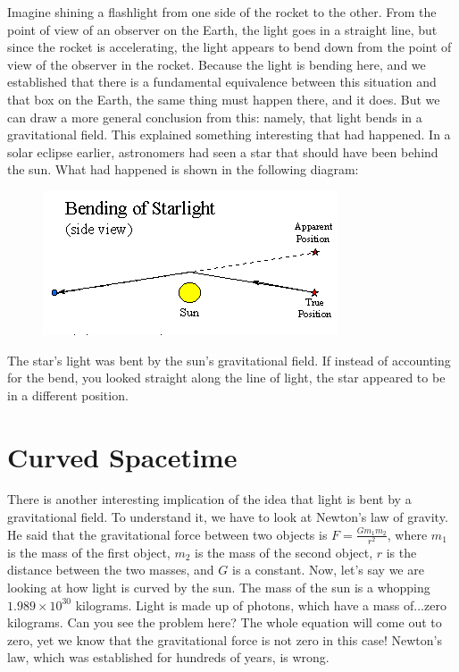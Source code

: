 Imagine shining a flashlight from one side of the rocket to the other. From the point of view of an observer on the Earth,
the light goes in a straight line, but since the rocket is accelerating, the light appears to bend down from the point of view of
the observer in the rocket. Because the light is bending here, and we established that there is a fundamental equivalence between
this situation and that box on the Earth, the same thing must happen there, and it does. But we can draw a more general conclusion
from this: namely, that light bends in a gravitational field. This explained something interesting that had happened. In a solar
eclipse earlier, astronomers had seen a star that should have been behind the sun. What had happened is shown in the following diagram:
\begin{figure}[H]
\includegraphics[scale=0.75]{bend.png}
\end{figure}
The star's light was bent by the sun's gravitational field. If instead of accounting for the bend, you looked straight along the line
of light, the star appeared to be in a different position.
\section{Curved Spacetime}
There is another interesting implication of the idea that light is bent by a gravitational field. To understand it, we have to look
at Newton's law of gravity. He said that the gravitational force between two objects is $F=\frac{Gm_1m_2}{r^2}$, where $m_1$ is 
the mass of the first object, $m_2$ is the mass of the second object, $r$ is the distance between the two masses, and $G$ is a constant.
Now, let's say we are looking at how light is curved by the sun. The mass of the sun is a whopping $1.989 \times 10^30$ kilograms. 
Light is made up of photons, which have a mass of...zero kilograms. Can you see the problem here? The whole equation will come out to
zero, yet we know that the gravitational force is not zero in this case! Newton's law, which was established for hundreds of years, is
wrong. 


